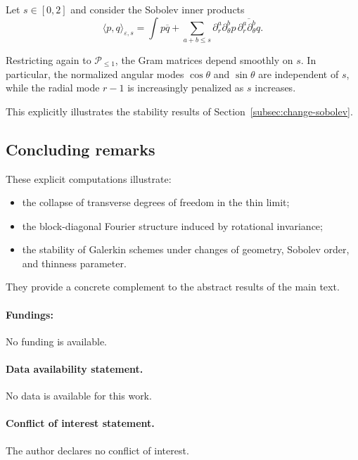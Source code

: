 \documentclass[11pt]{amsart}
\theoremstyle{plain}
\theoremstyle{definition}
\theoremstyle{remark}
\theoremstyle{remark}
\begin{document}
Let $s\in[0,2]$ and consider the Sobolev inner products
\[
\langle p,q\rangle_{\varepsilon,s}
=
\int p\overline q
+
\sum_{a+b\le s}
\partial_r^a\partial_\theta^b p\,
\overline{\partial_r^a\partial_\theta^b q}.
\]

Restricting again to $\mathcal P_{\le1}$, the Gram matrices depend smoothly on
$s$.
In particular, the normalized angular modes $\cos\theta$ and $\sin\theta$ are
independent of $s$, while the radial mode $r-1$ is increasingly penalized as $s$
increases.

This explicitly illustrates the stability results of
Section~\ref{subsec:change-sobolev}.

\subsection{Concluding remarks}

These explicit computations illustrate:
\begin{itemize}
\item the collapse of transverse degrees of freedom in the thin limit;
\item the block-diagonal Fourier structure induced by rotational invariance;
\item the stability of Galerkin schemes under changes of geometry, Sobolev order,
and thinness parameter.
\end{itemize}
They provide a concrete complement to the abstract results of the main text.
\vskip 12pt

\paragraph{\bf Fundings:} No funding is available.


\vskip 12pt

\paragraph{\bf Data availability statement.} No data is available for this work.

\vskip 12pt

\paragraph{\bf Conflict of interest statement.} The author declares no conflict of interest.

\vskip 12pt
\end{document}
